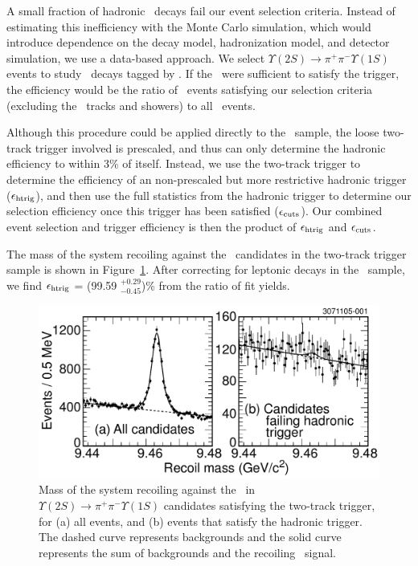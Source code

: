 \documentclass[aps,prl,twocolumn,superscriptaddress,showpacs,floatfix]{revtex4}
\begin{document}
A small fraction of hadronic \ups\ decays fail our event selection
criteria.  Instead of estimating this inefficiency with the Monte
Carlo simulation, which would introduce dependence on the decay model,
hadronization model, and detector simulation, we use a data-based
approach.  We select $\Upsilon(2S) \to \pi^+\pi^- \Upsilon(1S)$ events
to study \us\ decays tagged by \pipi.  If the \pipi\ were sufficient
to satisfy the trigger, the efficiency would be the ratio of \us\
events satisfying our selection criteria (excluding the \pipi\ tracks
and showers) to all \us\ events.

Although this procedure could be applied directly to the \uss\ sample,
the loose two-track trigger involved is prescaled, and thus can only
determine the hadronic efficiency to within 3\% of itself.  Instead,
we use the two-track trigger to determine the efficiency of an
non-prescaled but more restrictive hadronic trigger ($\epsilon_{\mbox{\scriptsize htrig}}$), and
then use the full statistics from the hadronic trigger to determine
our selection efficiency once this trigger has been satisfied
($\epsilon_{\mbox{\scriptsize cuts}}$).  Our combined event selection and trigger efficiency is
then the product of $\epsilon_{\mbox{\scriptsize htrig}}$ and $\epsilon_{\mbox{\scriptsize cuts}}$.

The mass of the system recoiling against the \pipi\ candidates in the
two-track trigger sample is shown in Figure~\ref{fig:cascades}.  After
correcting for leptonic decays in the \us\ sample, we find $\epsilon_{\mbox{\scriptsize htrig}}$ =
(99.59 $^{+0.29}_{-0.45}$)\% from the ratio of fit yields.

\begin{figure}
  \includegraphics[width=\linewidth]{cascades}
  \caption{\label{fig:cascades} Mass of the system recoiling against
the \pipi\ in $\Upsilon(2S) \to \pi^+\pi^- \Upsilon(1S)$ candidates
satisfying the two-track trigger, for (a) all events, and (b) events
that satisfy the hadronic trigger.  The dashed curve represents
backgrounds and the solid curve represents the sum of backgrounds and
the recoiling \us\ signal.}
\end{figure}
\end{document}
